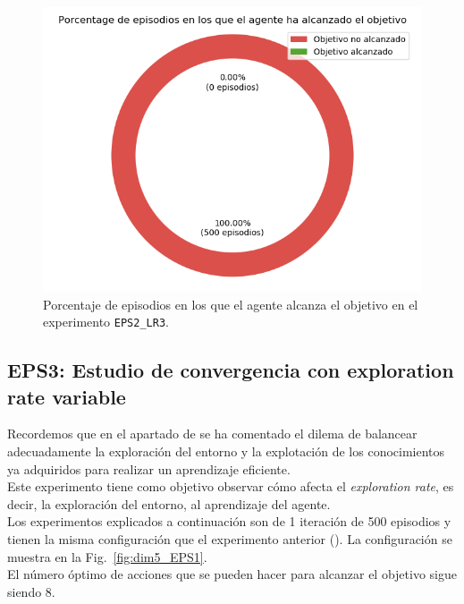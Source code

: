 \begin{figure}
    \centering
    \includegraphics[scale=0.4]{cap5_experimentacion/images/dim5_lr0.1ep0.2_porcentajeResuelto.png}
    \caption{Porcentaje de episodios en los que el agente alcanza el objetivo en el experimento \texttt{EPS2\_LR3}.}
    \label{fig:dim5_lr0.1ep0.2_porcentajeResuelto}
\end{figure}

\subsection{EPS3: Estudio de convergencia  con exploration rate variable} \label{EPS3}

Recordemos que en el apartado de \textbf{} se ha comentado el dilema de balancear adecuadamente la exploración del entorno y la explotación de los conocimientos ya adquiridos para realizar un aprendizaje eficiente. \\

Este experimento tiene como objetivo observar cómo afecta el \textit{exploration rate}, es decir, la exploración del entorno, al aprendizaje del agente. \\

Los experimentos explicados a continuación son de 1 iteración de 500 episodios y tienen la misma configuración que el experimento anterior (). La configuración se muestra en la  Fig.~\ref{fig:dim5_EPS1}. \\

El número óptimo de acciones que se pueden hacer para alcanzar el objetivo sigue siendo 8.\\ 


